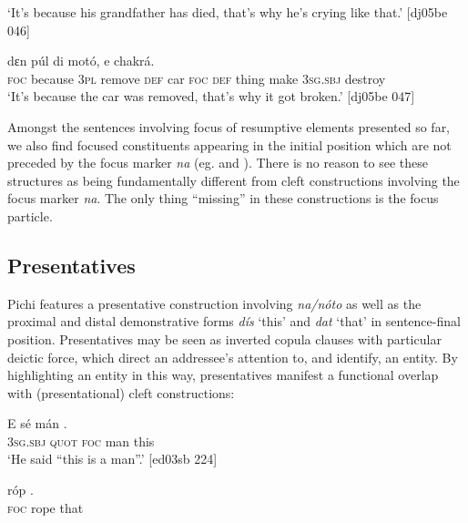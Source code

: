 \glt ‘It’s because his grandfather has died, that’s why he’s crying like that.’ [dj05be 046]
\z


\ea%
    \label{ex:key:725}
    \gll {}    dɛn  púl    di  motó,      
    e    chakrá.\\
\textsc{foc}  because  \textsc{3pl}  remove  \textsc{def}  car    \textsc{foc}  \textsc{def}  thing
make  \textsc{3sg.sbj}  destroy\\

\glt ‘It’s because the car was removed, that’s why it got broken.’ [dj05be 047]
\z

Amongst the sentences involving focus of resumptive elements presented so far, we also find focused constituents appearing in the initial position which are not preceded by the focus marker \textit{na} (eg.  and ). There is no reason to see these structures as being fundamentally different from cleft constructions involving the focus marker \textit{na}. The only thing “missing” in these constructions is the focus particle.

\subsection{Presentatives}\label{sec:7.4.4}

Pichi features a presentative construction involving \textit{na}\textit{\textup{/}}\textit{nóto} as well as the proximal and distal demonstrative forms \textit{dís} ‘this’  and \textit{dat} ‘that’  in sentence-final position. Presentatives may be seen as inverted copula clauses with particular deictic force, which direct an addressee’s attention to, and identify, an entity. By highlighting an entity in this way, presentatives manifest a functional overlap with (presentational) cleft constructions: 


\ea%
    \label{ex:key:726}
    \gll E    sé     mán    .\\
\textsc{3sg.sbj}  \textsc{quot}    \textsc{foc}  man    this\\

\glt ‘He said “this is a man”.’ [ed03sb 224]
\z


\ea%
    \label{ex:key:727}
    \gll {} róp    .\\
\textsc{foc}  rope  that\\


